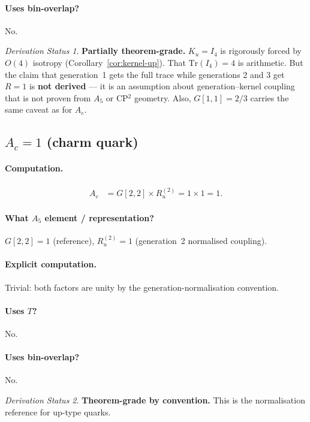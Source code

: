 \documentclass[11pt]{article}
\theoremstyle{remark}
\newtheorem*{status}{Derivation Status}
\begin{document}
\paragraph{Uses bin-overlap?} No.

\begin{status}
\textbf{Partially theorem-grade.}
$K_u = I_4$ is rigorously forced by $O(4)$ isotropy (Corollary~\ref{cor:kernel-up}).
That $\mathrm{Tr}(I_4) = 4$ is arithmetic.
But the claim that generation~1 gets the full trace while generations 2 and 3 get $R = 1$ is \textbf{not derived} --- it is an assumption about generation--kernel coupling that is not proven from $A_5$ or CP$^2$ geometry.
Also, $G[1,1] = 2/3$ carries the same caveat as for $A_e$.
\end{status}

\subsection{$A_c = 1$ \quad (charm quark)}

\paragraph{Computation.}
\begin{align}
A_c &= G[2,2] \times R_u^{(2)} = 1 \times 1 = 1.
\end{align}

\paragraph{What $A_5$ element / representation?}
$G[2,2] = 1$ (reference), $R_u^{(2)} = 1$ (generation~2 normalised coupling).

\paragraph{Explicit computation.}
Trivial: both factors are unity by the generation-normalisation convention.

\paragraph{Uses $T$?} No.
\paragraph{Uses bin-overlap?} No.

\begin{status}
\textbf{Theorem-grade by convention.}
This is the normalisation reference for up-type quarks.
\end{status}
\end{document}
